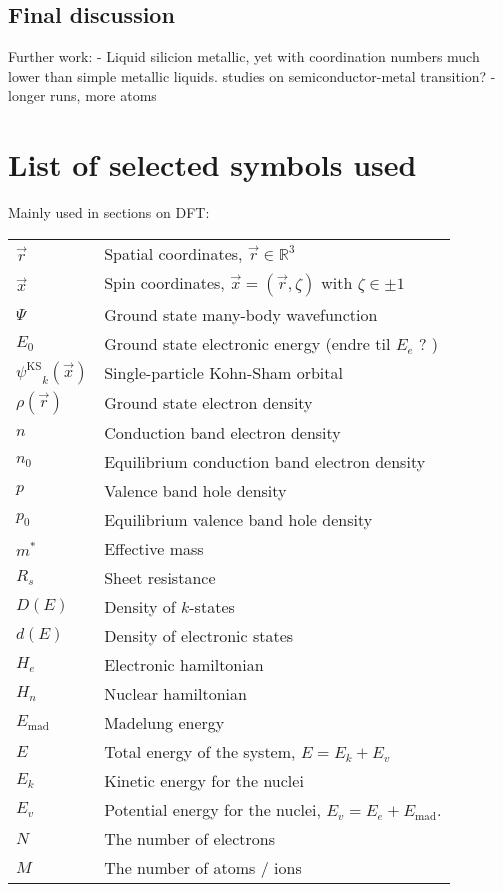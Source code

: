 \documentclass[11pt,bibliography=totoc,index=totoc]{scrbook}   %
\newcommand{\ksorb}{\ensuremath{\psi^{\mathrm{KS}}}}
\begin{document}
%
\section{Final discussion}
%


Further work:
- Liquid silicion metallic\cite{Glazov:1969}, yet with coordination numbers much lower than simple metallic liquids.
 studies on semiconductor-metal transition?
- longer runs, more atoms


\printbibliography

\appendix
\chapter{List of selected symbols used}
  Mainly used in sections on DFT:

  \begin{tabular}{ll}
    $\vec{r}$ & Spatial coordinates, $\vec{r}\in\mathbb{R}^3$ \\
    $\vec{x}$ & Spin coordinates, $\vec{x}=(\vec{r},\zeta)$ with $\zeta\in\pm 1$ \\
    $\Psi$  & Ground state many-body wavefunction \\
    $E_0$   & Ground state electronic energy (endre til $E_e$ ? ) \\
    $\ksorb_k(\vec{x})$  & Single-particle Kohn-Sham orbital \\
    $\rho(\vec{r})$  & Ground state electron density \\
	$n$		& Conduction band electron density \\
	$n_0$	& Equilibrium conduction band electron density \\
	$p$		& Valence band hole density \\
	$p_0$	& Equilibrium valence band hole density \\
	$m^*$	& Effective mass \\
	$R_s$	& Sheet resistance \\
	$D(E)$	& Density of $k$-states \\
	$d(E)$	& Density of electronic states \\
    $H_e$   & Electronic hamiltonian \\
    $H_n$   & Nuclear hamiltonian \\
    $E_{\text{mad}}$ & Madelung energy \\
    $E$     & Total energy of the system, $E = E_k + E_v$ \\
    $E_k$   & Kinetic energy for the nuclei \\
    $E_v$   & Potential energy for the nuclei, $E_v = E_e + E_{\text{mad}}$. \\
    $N$     & The number of electrons \\
    $M$     & The number of atoms / ions
  \end{tabular}
\end{document}
